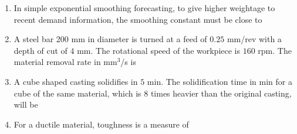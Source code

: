 \documentclass[journal]{IEEEtran}
\begin{document}
\begin{enumerate}[leftmargin=0pt]
\item In simple exponential smoothing forecasting, to give higher weightage to recent demand information, the smoothing constant must be close to 
\begin{enumerate}
\end{enumerate}
\hfill{}

\item A steel bar 200 mm in diameter is turned at a feed of $0.25$ mm/rev with a depth of cut of $4$ mm. The rotational speed of the workpiece is $160$ rpm. The material removal rate in mm$^3$/s is 
\begin{enumerate}
\end{enumerate}
\hfill{}

\item A cube shaped casting solidifies in $5$ min. The solidification time in min for a cube of the same material, which is $8$ times heavier than the original casting, will be 
\begin{enumerate}
\end{enumerate}
\hfill{}

\item For a ductile material, toughness is a measure of 
\begin{enumerate}
\end{enumerate}
\hfill{}


\end{enumerate}
\end{document}
